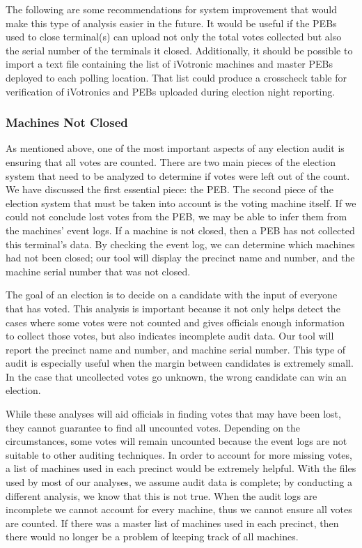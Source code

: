 The following are some recommendations for system improvement that would make this type of analysis easier in the future.  It would be useful if the PEBs used to close terminal(s) can upload not only the total votes collected but also the serial number of the terminals it closed. Additionally, it should be possible to import a text file containing the list of iVotronic machines and master PEBs deployed to each polling location.  That list could produce a crosscheck table for verification of iVotronics and PEBs uploaded during election night reporting.

\subsubsection{Machines Not Closed}
As mentioned above, one of the most important aspects of any election audit is ensuring that all votes are counted.  There are two main pieces of the election system that need to be analyzed to determine if votes were left out of the count.  We have discussed the first essential piece: the PEB.  The second piece of the election system that must be taken into account is the voting machine itself.  If we could not conclude lost votes from the PEB, we may be able to infer them from the machines' event logs.  If a machine is not closed, then a PEB has not collected this terminal's data.  By checking the event log, we can determine which machines had not been closed; our tool will display the precinct name and number, and the machine serial number that was not closed.  

The goal of an election is to decide on a candidate with the input of everyone that has voted.  This analysis is important because it not only helps detect the cases where some votes were not counted and gives officials enough information to collect those votes, but also indicates incomplete audit data.  Our tool will report the precinct name and number, and machine serial number.  This type of audit is especially useful when the margin between candidates is extremely small.  In the case that uncollected votes go unknown, the wrong candidate can win an election.  	

While these analyses will aid officials in finding votes that may have been lost, they cannot guarantee to find all uncounted votes.  Depending on the circumstances, some votes will remain uncounted because the event logs are not suitable to other auditing techniques.  In order to account for more missing votes, a list of machines used in each precinct would be extremely helpful.  With the files used by most of our analyses, we assume audit data is complete; by conducting a different analysis, we know that this is not true.  When the audit logs are incomplete we cannot account for every machine, thus we cannot ensure all votes are counted.  If there was a master list of machines used in each precinct, then there would no longer be a problem of keeping track of all machines.  


